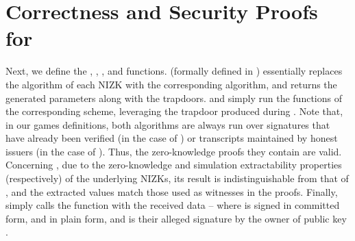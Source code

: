 \section{Correctness and Security Proofs for \CUASGen}
\label{app:uas-proofs}

Next, we define the \SimSetup, \ExtractIssue, \ExtractSign, and \VerCred
functions. \SimSetup (formally defined in ) essentially
replaces the \Setup algorithm of each NIZK with the corresponding \NIZKSimSetup
algorithm, and returns the generated parameters along with the trapdoors.
\ExtractIssue and \ExtractSign simply run the \helper{\Extract} functions of the
corresponding \NIZK scheme, leveraging the trapdoor produced during \SimSetup.
Note that, in our games definitions, both algorithms are always run over
signatures that have already been verified (in the case of \ExtractSign)
or transcripts maintained by honest issuers (in the case of \ExtractIssue).
Thus, the zero-knowledge proofs they contain are valid. Concerning \SimSetup,
due to the zero-knowledge and simulation extractability properties
(respectively) of the underlying NIZKs, its result is indistinguishable from
that of \Setup, and the extracted values match those used as witnesses in the
proofs. Finally, \VerCred simply calls the \SBCMVerify function with the
received data -- where \usk is signed in committed form, \cid and \attrs in
plain form, and \cred is their alleged signature by the owner of public key
\ipk.

